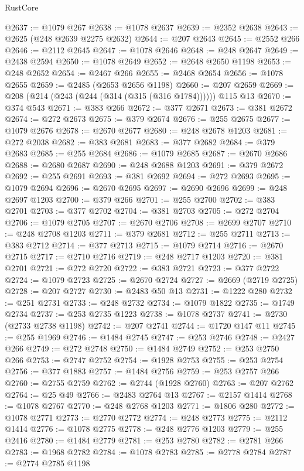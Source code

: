 \begin{lexlean}{RustCore}
\begin{coremodule}
@2637 := @1079 @267
@2638 := @1078 @2637
@2639 := @2352 @2638
@2643 := @2625 (@248 @2639 @2275 @2632)
@2644 := @207 @2643
@2645 := @2552 @266
@2646 := @2112 @2645
@2647 := @1078 @2646
@2648 := @248 @2647
@2649 := @2438 @2594
@2650 := @1078 @2649
@2652 := @2648 @2650 @1198
@2653 := @248 @2652
@2654 := @2467 @266
@2655 := @2468 @2654
@2656 := @1078 @2655
@2659 := @2485 (@2653 @2656 @1198)
@2660 := @207 @2659
@2669 := @208 (@214 (@243 (@244 (@314 (@315 (@316 @1784)))))) @115 @13
@2670 := @374 @543
@2671 := @383 @266
@2672 := @377 @2671
@2673 := @381 @2672
@2674 := @272 @2673
@2675 := @379 @2674
@2676 := @255 @2675
@2677 := @1079 @2676
@2678 := @2670 @2677
@2680 := @248 @2678 @1203
@2681 := @272 @2038
@2682 := @383 @2681
@2683 := @377 @2682
@2684 := @379 @2683
@2685 := @255 @2684
@2686 := @1079 @2685
@2687 := @2670 @2686
@2688 := @2680 @2687
@2690 := @248 @2688 @1203
@2691 := @379 @2672
@2692 := @255 @2691
@2693 := @381 @2692
@2694 := @272 @2693
@2695 := @1079 @2694
@2696 := @2670 @2695
@2697 := @2690 @2696
@2699 := @248 @2697 @1203
@2700 := @379 @266
@2701 := @255 @2700
@2702 := @383 @2701
@2703 := @377 @2702
@2704 := @381 @2703
@2705 := @272 @2704
@2706 := @1079 @2705
@2707 := @2670 @2706
@2708 := @2699 @2707
@2710 := @248 @2708 @1203
@2711 := @379 @2681
@2712 := @255 @2711
@2713 := @383 @2712
@2714 := @377 @2713
@2715 := @1079 @2714
@2716 := @2670 @2715
@2717 := @2710 @2716
@2719 := @248 @2717 @1203
@2720 := @381 @2701
@2721 := @272 @2720
@2722 := @383 @2721
@2723 := @377 @2722
@2724 := @1079 @2723
@2725 := @2670 @2724
@2727 := @2669 (@2719 @2725)
@2728 := @207 @2727
@2730 := @2483 @50 @13
@2731 := @1222 @280
@2732 := @251 @2731
@2733 := @248 @2732
@2734 := @1079 @1822
@2735 := @1749 @2734
@2737 := @253 @2735 @1223
@2738 := @1078 @2737
@2741 := @2730 (@2733 @2738 @1198)
@2742 := @207 @2741
@2744 := @1720 @147 @11
@2745 := @255 @1969
@2746 := @1484 @2745
@2747 := @253 @2746
@2748 := @2427 @266
@2749 := @272 @2748
@2750 := @1484 @2749
@2752 := @253 @2750 @266
@2753 := @2747 @2752
@2754 := @1928 @2753
@2755 := @253 @2754
@2756 := @377 @1883
@2757 := @1484 @2756
@2759 := @253 @2757 @266
@2760 := @2755 @2759
@2762 := @2744 (@1928 @2760)
@2763 := @207 @2762
@2764 := @25 @49
@2766 := @2483 @2764 @13
@2767 := @2157 @1414
@2768 := @1078 @2767
@2770 := @248 @2768 @1203
@2771 := @1806 @280
@2772 := @1078 @2771
@2773 := @2770 @2772
@2774 := @248 @2773
@2775 := @2112 @1414
@2776 := @1078 @2775
@2778 := @248 @2776 @1203
@2779 := @255 @2416
@2780 := @1484 @2779
@2781 := @253 @2780
@2782 := @2781 @266
@2783 := @1968 @2782
@2784 := @1078 @2783
@2785 := @2778 @2784
@2787 := @2774 @2785 @1198

\end{coremodule}
\end{lexlean}
